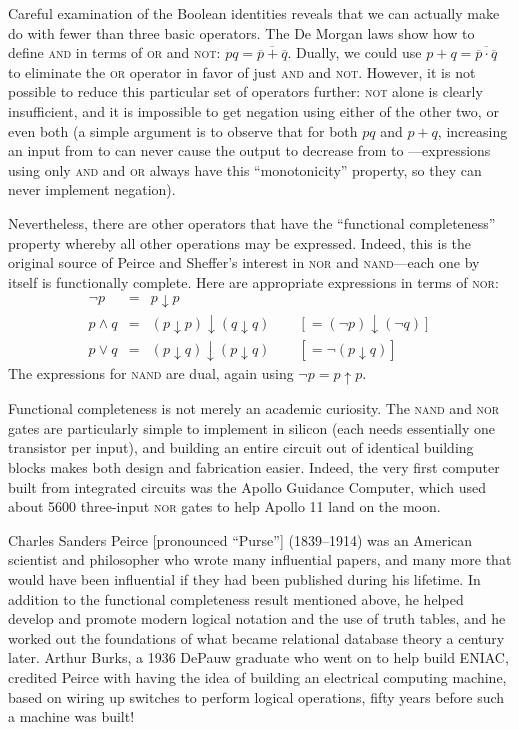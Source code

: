 Careful examination of the Boolean identities reveals that we can actually make do with fewer than three basic operators. The De Morgan laws show how to define \textsc{and} in terms of \textsc{or} and \textsc{not}: $pq=\overline{\overline{p}+\overline{q}}$. Dually, we could use $p+q=\overline{\overline{p}\cdot\overline{q}}$ to eliminate the \textsc{or} operator in favor of just \textsc{and} and \textsc{not}. However, it is not possible to reduce this particular set of operators further: \textsc{not} alone is clearly insufficient, and it is impossible to get negation using either of the other two, or even both (a simple argument is to observe that for both $pq$ and $p+q$, increasing an input from \0 to \1 can never cause the output to decrease from \1 to \0---expressions using only \textsc{and} and \textsc{or} always have this ``monotonicity'' property, so they can never implement negation).

Nevertheless, there are other operators that have the ``functional completeness'' property whereby all other operations may be expressed. Indeed, this is the original source of Peirce and Sheffer's interest in \textsc{nor} and \textsc{nand}---each one by itself is functionally complete. Here are appropriate expressions in terms of \textsc{nor}:
\[ \begin{array}{rcl}
\lnot p & = & p\downarrow p\\
p\land q & = & (p\downarrow p)\downarrow(q\downarrow q)\qquad[=(\lnot p)\downarrow(\lnot q)]\\
p\lor q & = & (p\downarrow q)\downarrow(p\downarrow q)\qquad[=\lnot (p\downarrow q)]
\end{array} \]
The expressions for \textsc{nand} are dual, again using $\lnot p=p\uparrow p$.

Functional completeness is not merely an academic curiosity. The \textsc{nand} and \textsc{nor} gates are particularly simple to implement in silicon (each needs essentially one transistor per input), and building an entire circuit out of identical building blocks makes both design and fabrication easier. Indeed, the very first computer built from integrated circuits was the Apollo Guidance Computer, which used about 5600 three-input \textsc{nor} gates to help Apollo 11 land on the moon.

\begin{tailquote}
Charles Sanders Peirce [pronounced ``Purse''] (1839--1914) was an American scientist and philosopher who wrote many influential papers, and many more that would have been influential if they had been published during his lifetime. In addition to the functional completeness result mentioned above, he helped develop and promote modern logical notation and the use of truth tables, and he worked out the foundations of what became relational database theory a century later. Arthur Burks, a 1936 DePauw graduate who went on to help build ENIAC, credited Peirce with having the idea of building an electrical computing machine, based on wiring up switches to perform logical operations, fifty years before such a machine was built!
\end{tailquote}

